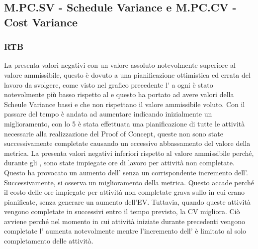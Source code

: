 \subsection{M.PC.SV - Schedule Variance e M.PC.CV - Cost Variance}

\subsubsection{RTB}
La  presenta valori negativi con un valore assoluto notevolmente superiore al valore ammissibile, questo è dovuto a una pianificazione
ottimistica ed errata del lavoro da svolgere, come visto nel grafico precedente l' a ogni  è stato notevolmente più basso rispetto al 
e questo ha portato ad avere valori della Scheule Variance bassi e che non rispettano il valore ammissibile voluto.
Con il passare del tempo è andata ad aumentare indicando inizialmente un miglioramento, con lo  5 è stata effettuata una pianificazione di tutte le attività
necessarie alla realizzazione del Proof of Concept, queste non sono state successivamente completate causando un eccessivo abbassamento del valore della metrica.
La  presenta valori negativi inferiori rispetto al valore ammissibile perché, durante gli , sono state impiegate ore di lavoro per attività non completate. 
Questo ha provocato un aumento dell' senza un corrispondente incremento dell'.
Successivamente, si osserva un miglioramento della metrica. Questo accade perché il costo delle ore impiegate per attività non completate grava sullo  in cui erano pianificate, 
senza generare un aumento dell'EV. Tuttavia, quando queste attività vengono completate in  successivi entro il tempo previsto, la CV migliora.
Ciò avviene perché nel momento in cui attività iniziate durante  precedenti vengono completate l' aumenta notevolmente mentre l'incremento dell' è limitato al solo completamento delle attività.
